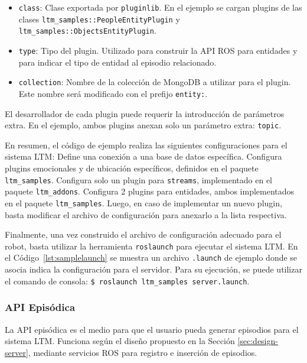 \begin{itemize}
\begin{itemize}
	\item \texttt{class}: Clase exportada por \texttt{pluginlib}. En el ejemplo se cargan plugins de las clases \texttt{ltm\_samples::PeopleEntityPlugin} y \texttt{ltm\_samples::ObjectsEntityPlugin}.
	\item \texttt{type}: Tipo del plugin. Utilizado para construir la API ROS para entidades y para indicar el tipo de entidad al episodio relacionado.
	\item \texttt{collection}: Nombre de la colección de MongoDB a utilizar para el plugin. Este nombre será modificado con el prefijo \texttt{entity:}.
\end{itemize}
El desarrollador de cada plugin puede requerir la introducción de parámetros extra. En el ejemplo, ambos plugins anexan solo un parámetro extra: \texttt{topic}.
\end{itemize}

En resumen, el código de ejemplo realiza las siguientes configuraciones para el sistema LTM: Define una conexión a una base de datos específica. Configura plugins emocionales y de ubicación específicos, definidos en el paquete \texttt{ltm\_samples}. Configura solo un plugin para \texttt{streams}, implementado en el paquete \texttt{ltm\_addons}. Configura 2 plugins para entidades, ambos implementados en el paquete \texttt{ltm\_samples}. Luego, en caso de implementar un nuevo plugin, basta modificar el archivo de configuración para anexarlo a la lista respectiva.

Finalmente, una vez construido el archivo de configuración adecuado para el robot, basta utilizar la herramienta \texttt{roslaunch} para ejecutar el sistema LTM. En el Código~\ref{lst:samplelaunch} se muestra un archivo \texttt{.launch} de ejemplo donde se asocia indica la configuración para el servidor. Para su ejecución, se puede utilizar el comando de consola: \texttt{\$ roslaunch ltm\_samples server.launch}.
\lstset{style=/Style/XML/ROS}



\subsubsection{API Episódica}

La API episódica es el medio para que el usuario pueda generar episodios para el sistema LTM. Funciona según el diseño propuesto en la Sección \ref{sec:design-server}, mediante servicios ROS para registro e inserción de episodios.

